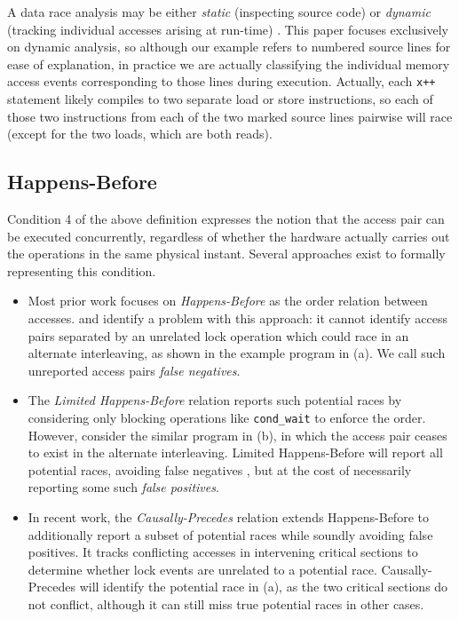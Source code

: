 A data race analysis may be either {\em static} (inspecting source code) \cite{racerx} or {\em dynamic} (tracking individual accesses arising at run-time) \cite{tsan}.
This paper focuses exclusively on dynamic analysis,
so although our example refers to numbered source lines for ease of explanation,
in practice we are actually classifying the individual memory access events corresponding to those lines during execution.
Actually, each {\tt x++} statement likely compiles to two separate load or store instructions, so each of those two instructions from each of the two marked source lines pairwise will race (except for the two loads, which are both reads).

\subsection{Happens-Before}
\label{sec:background-hb}

Condition 4 of the above definition expresses the notion that the access pair can be executed concurrently,
regardless of whether the hardware actually carries out the operations in the same physical instant.
Several approaches exist to formally representing this condition.

\begin{itemize}
	\item Most prior work focuses on {\em Happens-Before} \cite{lamport-clocks} as the order relation between accesses.
\cite{predictive-dr} and \cite{hybriddatarace} identify a problem with this approach:
it cannot identify access pairs separated by an unrelated lock operation which could race in an alternate interleaving,
as shown in the example program in (a).
We call such unreported access pairs {\em false negatives}.

\item
The {\em Limited Happens-Before} relation \cite{hybriddatarace}
reports such potential races
by considering only blocking operations like {\tt cond\_wait} to enforce the order.
However, consider the similar program in (b),
in which the access pair ceases to exist in the alternate interleaving.
Limited Happens-Before will report all potential races, avoiding false negatives \cite{tsan},
but at the cost of necessarily reporting some such {\em false positives}.

\item
In recent work, the {\em Causally-Precedes} relation \cite{predictive-dr} %
extends Happens-Before to additionally report a subset of potential races while soundly avoiding false positives.
It tracks conflicting accesses in intervening
critical sections to determine whether lock events are unrelated to a potential race.
Causally-Precedes will identify the potential race in (a), as the two critical sections do not conflict,
although it can still miss true potential races in other cases.
\end{itemize}

